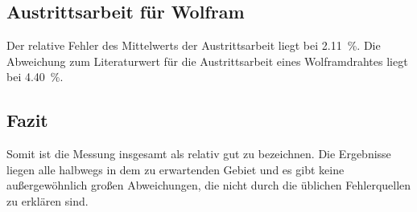 \subsection{Austrittsarbeit für Wolfram}
Der relative Fehler des Mittelwerts der Austrittsarbeit liegt bei \SI{2.11}{\percent}. Die Abweichung zum Literaturwert 
für die Austrittsarbeit eines Wolframdrahtes liegt bei \SI{4.40}{\percent}. 

\subsection{Fazit}
Somit ist die Messung insgesamt als relativ gut zu bezeichnen. Die Ergebnisse liegen alle halbwegs in dem zu 
erwartenden Gebiet und es gibt keine außergewöhnlich großen Abweichungen, die nicht durch die üblichen Fehlerquellen 
zu erklären sind. %
